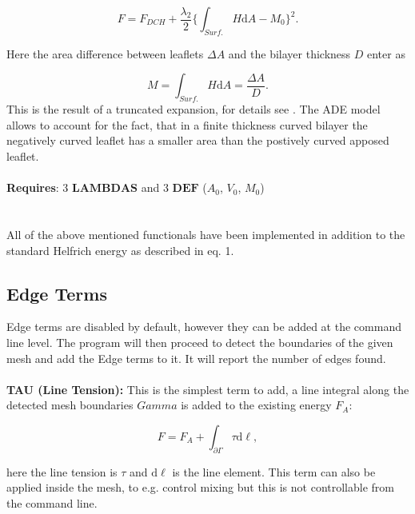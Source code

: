 \documentclass[11pt]{article}
\begin{document}
\begin{equation}
 F = F_{DCH}  + \frac {\lambda_2}{2}   \bigg\{ \int_{Surf.} H \mathrm{d}A - M_0 \bigg\}^2.
\end{equation}

Here the area difference between leaflets $\Delta A$ and the bilayer thickness $D$ enter as

\begin{equation}
    M = \int_{Surf.} H \mathrm{d}A = \frac{\Delta A}{D}.
\end{equation}
This is the result of a truncated expansion, for details see \cite{PhysRevE.49.5389}. The ADE model allows to account for the fact, that in a finite thickness curved bilayer the negatively curved leaflet has a smaller area than the postively curved apposed leaflet.  \\
\noindent
\vspace{0.2 cm} \\
\textbf{Requires}: 3 $\textbf{LAMBDAS}$ and 3 $\textbf{DEF}$ ($A_0$, $V_0$, $M_0$)\\
\noindent \\
\vspace{0.2 cm} \\

All of the above mentioned functionals have been implemented in addition to the standard Helfrich energy as described in eq. 1. 

\subsection{Edge Terms}
Edge terms are disabled by default, however they can be added at the command line level. The program will then proceed to detect the boundaries of the given mesh and add the Edge terms to it. It will report the number of edges found.
\noindent \\
\vspace{0.2 cm} \\
\textbf{TAU (Line Tension):} 
This is the simplest term to add, a line integral along the detected mesh boundaries $Gamma$ is added to the existing energy $F_A$:

\begin{equation}
    F = F_A + \int_{\partial \Gamma} \tau \mathrm{d} \ell,
\end{equation}

here the line tension is $\tau$ and $\mathrm{d} \ell$ is the line element. This term can also be applied inside the mesh, to e.g. control mixing but this is not controllable from the command line.
\end{document}
